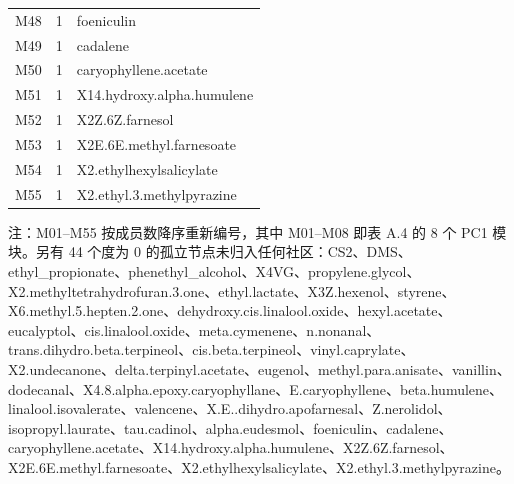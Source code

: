 \begin{longtable}{@{}l r p{}@{}}
M48 & 1 & foeniculin \\
M49 & 1 & cadalene \\
M50 & 1 & caryophyllene.\allowbreak{}acetate \\
M51 & 1 & X14.\allowbreak{}hydroxy.\allowbreak{}alpha.\allowbreak{}humulene \\
M52 & 1 & X2Z.\allowbreak{}6Z.\allowbreak{}farnesol \\
M53 & 1 & X2E.\allowbreak{}6E.\allowbreak{}methyl.\allowbreak{}farnesoate \\
M54 & 1 & X2.\allowbreak{}ethylhexylsalicylate \\
M55 & 1 & X2.\allowbreak{}ethyl.\allowbreak{}3.\allowbreak{}methylpyrazine \\
\end{longtable}

\noindent\footnotesize 注：M01--M55 按成员数降序重新编号，其中 M01--M08 即表 A.4 的 8 个 PC1 模块。另有 44 个度为 0 的孤立节点未归入任何社区：CS2、DMS、ethyl\_propionate、phenethyl\_alcohol、X4VG、propylene.\allowbreak{}glycol、X2.\allowbreak{}methyltetrahydrofuran.\allowbreak{}3.\allowbreak{}one、ethyl.\allowbreak{}lactate、X3Z.\allowbreak{}hexenol、styrene、X6.\allowbreak{}methyl.\allowbreak{}5.\allowbreak{}hepten.\allowbreak{}2.\allowbreak{}one、dehydroxy.\allowbreak{}cis.\allowbreak{}linalool.\allowbreak{}oxide、hexyl.\allowbreak{}acetate、eucalyptol、cis.\allowbreak{}linalool.\allowbreak{}oxide、meta.\allowbreak{}cymenene、n.\allowbreak{}nonanal、trans.\allowbreak{}dihydro.\allowbreak{}beta.\allowbreak{}terpineol、cis.\allowbreak{}beta.\allowbreak{}terpineol、vinyl.\allowbreak{}caprylate、X2.\allowbreak{}undecanone、delta.\allowbreak{}terpinyl.\allowbreak{}acetate、eugenol、methyl.\allowbreak{}para.\allowbreak{}anisate、vanillin、dodecanal、X4.\allowbreak{}8.\allowbreak{}alpha.\allowbreak{}epoxy.\allowbreak{}caryophyllane、E.\allowbreak{}caryophyllene、beta.\allowbreak{}humulene、linalool.\allowbreak{}isovalerate、valencene、X.\allowbreak{}E.\allowbreak{}.\allowbreak{}dihydro.\allowbreak{}apofarnesal、Z.\allowbreak{}nerolidol、isopropyl.\allowbreak{}laurate、tau.\allowbreak{}cadinol、alpha.\allowbreak{}eudesmol、foeniculin、cadalene、caryophyllene.\allowbreak{}acetate、X14.\allowbreak{}hydroxy.\allowbreak{}alpha.\allowbreak{}humulene、X2Z.\allowbreak{}6Z.\allowbreak{}farnesol、X2E.\allowbreak{}6E.\allowbreak{}methyl.\allowbreak{}farnesoate、X2.\allowbreak{}ethylhexylsalicylate、X2.\allowbreak{}ethyl.\allowbreak{}3.\allowbreak{}methylpyrazine。

